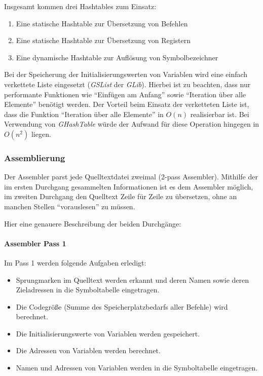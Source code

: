 Insgesamt kommen drei Hashtables zum Einsatz:
\begin{enumerate}
    \item Eine statische Hashtable zur Übersetzung von Befehlen
    \item Eine statische Hashtable zur Übersetzung von Registern
    \item Eine dynamische Hashtable zur Auflösung von Symbolbezeichner
\end{enumerate}

Bei der Speicherung der Initialisierungswerten von Variablen wird eine
einfach verkettete Liste eingesetzt (\emph{GSList} der \emph{GLib}).
Hierbei ist zu beachten, dass nur performante Funktionen wie
``Einfügen am Anfang'' sowie ``Iteration über alle Elemente'' benötigt werden.
Der Vorteil beim Einsatz der verketteten Liste ist, dass die
Funktion ``Iteration über alle Elemente'' in $O(n)$ realisierbar ist. Bei
Verwendung von \emph{GHashTable} würde der Aufwand für diese Operation hingegen
in $O(n^2)$ liegen.

\subsubsection{Assemblierung}

Der Assembler parst jede Quelltextdatei zweimal (2-pass Assembler). Mithilfe der
im ersten Durchgang gesammelten Informationen ist es dem Assembler möglich, im
zweiten Durchgang den Quelltext Zeile für Zeile zu übersetzen, ohne an manchen
Stellen ``vorauslesen'' zu müssen.

Hier eine genauere Beschreibung der beiden Durchgänge:

\paragraph{Assembler Pass 1}

Im Pass 1 werden folgende Aufgaben erledigt:
\begin{itemize}
    \item Sprungmarken im Quelltext werden erkannt und deren Namen sowie deren
          Zieladressen in die Symboltabelle eingetragen.
    \item Die Codegröße (Summe des Speicherplatzbedarfs aller Befehle) wird
          berechnet.
    \item Die Initialisierungswerte von Variablen werden gespeichert.
    \item Die Adressen von Variablen werden berechnet.
    \item Namen und Adressen von Variablen werden in die Symboltabelle
          eingetragen.
\end{itemize}

